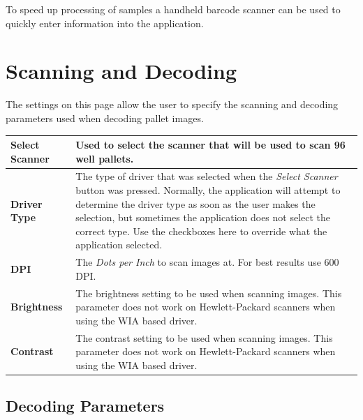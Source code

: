 To speed up processing of samples a handheld barcode scanner can be used to
quickly enter information into the application.

\section{Scanning and Decoding}
The settings on this page allow the user to specify the scanning and
decoding parameters used when decoding pallet images.
\begin{center}
\begin{tabular}{|l|p{5in}|}
  \hline
  \textbf{Select Scanner} & Used to select the scanner that will be used to scan
    96 well pallets.\\
  \hline
  \textbf{Driver Type} & The type of driver that was selected when the \emph{Select
    Scanner} button was pressed. Normally, the application will attempt to
    determine the driver type as soon as the user makes the selection, but
    sometimes the application does not select the correct type. Use the
    checkboxes here to override what the application selected.\\
  \hline
  \textbf{DPI} & The \emph{Dots per Inch} to scan images at. For best results use
    600 DPI.\\
  \hline
  \textbf{Brightness} & The brightness setting to be used when scanning
    images. This parameter does not work on Hewlett-Packard scanners when using
    the WIA based driver.\\
  \hline
  \textbf{Contrast} & The contrast setting to be used when scanning
    images. This parameter does not work on Hewlett-Packard scanners when using
    the WIA based driver.\\
  \hline
\end{tabular}
\end{center}
\subsection{Decoding Parameters}

